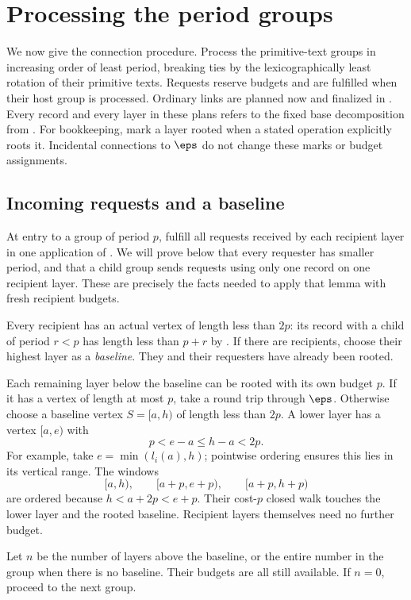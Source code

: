\section{Processing the period groups}\label{sec:processing}

We now give the connection procedure. Process the primitive-text groups in increasing order of least period, breaking ties by the lexicographically least rotation of their primitive texts. Requests reserve budgets and are fulfilled when their host group is processed. Ordinary links are planned now and finalized in . Every record and every layer in these plans refers to the fixed base decomposition from . For bookkeeping, mark a layer rooted when a stated operation explicitly roots it. Incidental connections to $\eps$ do not change these marks or budget assignments.

\subsection{Incoming requests and a baseline}

At entry to a group of period $p$, fulfill all requests received by each recipient layer in one application of . We will prove below that every requester has smaller period, and that a child group sends requests using only one record on one recipient layer. These are precisely the facts needed to apply that lemma with fresh recipient budgets.

Every recipient has an actual vertex of length less than $2p$: its record with a child of period $r<p$ has length less than $p+r$ by . If there are recipients, choose their highest layer as a \emph{baseline}. They and their requesters have already been rooted.

Each remaining layer below the baseline can be rooted with its own budget $p$. If it has a vertex of length at most $p$, take a round trip through $\eps$. Otherwise choose a baseline vertex $S=[a,h)$ of length less than $2p$. A lower layer has a vertex $[a,e)$ with
\[
p<e-a\le h-a<2p.
\]
For example, take $e=\min(l_i(a),h)$; pointwise ordering ensures this lies in its vertical range. The windows
\[
[a,h),\qquad[a+p,e+p),\qquad[a+p,h+p)
\]
are ordered because $h<a+2p<e+p$. Their cost-$p$ closed walk touches the lower layer and the rooted baseline. Recipient layers themselves need no further budget.

Let $n$ be the number of layers above the baseline, or the entire number in the group when there is no baseline. Their budgets are all still available. If $n=0$, proceed to the next group.

